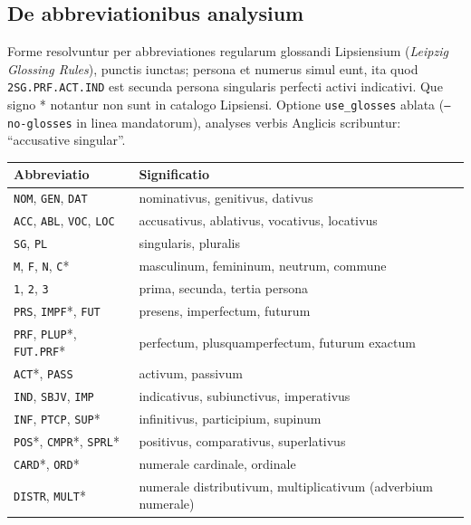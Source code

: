 \documentclass[12pt,
              article,
              oneside
              ]{memoir}
\begin{document}
\subsection{De abbreviationibus analysium}
\label{sec:glosses}

%
Forme resolvuntur per abbreviationes regularum glossandi Lipsiensium
(\textit{Leipzig Glossing Rules}), punctis iunctas; persona et numerus
simul eunt, ita quod \texttt{2SG.PRF.ACT.IND} est secunda persona
singularis perfecti activi indicativi. Que signo * notantur non sunt in
catalogo Lipsiensi. Optione \texttt{use\_glosses} ablata
(\texttt{--no-glosses} in linea mandatorum), analyses verbis Anglicis
scribuntur: \enquote{accusative singular}.

\begin{longtable}{@{}lp{}@{}}
\toprule
Abbreviatio & Significatio\\
\midrule
\endhead
\texttt{NOM}, \texttt{GEN}, \texttt{DAT} & nominativus, genitivus, dativus\\
\texttt{ACC}, \texttt{ABL}, \texttt{VOC}, \texttt{LOC} & accusativus, ablativus, vocativus, locativus\\
\texttt{SG}, \texttt{PL} & singularis, pluralis\\
\texttt{M}, \texttt{F}, \texttt{N}, \texttt{C}* & masculinum, femininum, neutrum, commune\\
\texttt{1}, \texttt{2}, \texttt{3} & prima, secunda, tertia persona\\
\texttt{PRS}, \texttt{IMPF}*, \texttt{FUT} & presens, imperfectum, futurum\\
\texttt{PRF}, \texttt{PLUP}*, \texttt{FUT.PRF}* & perfectum, plusquamperfectum, futurum exactum\\
\texttt{ACT}*, \texttt{PASS} & activum, passivum\\
\texttt{IND}, \texttt{SBJV}, \texttt{IMP} & indicativus, subiunctivus, imperativus\\
\texttt{INF}, \texttt{PTCP}, \texttt{SUP}* & infinitivus, participium, supinum\\
\texttt{POS}*, \texttt{CMPR}*, \texttt{SPRL}* & positivus, comparativus, superlativus\\
\texttt{CARD}*, \texttt{ORD}* & numerale cardinale, ordinale\\
\texttt{DISTR}, \texttt{MULT}* & numerale distributivum, multiplicativum (adverbium numerale)\\
\bottomrule
\end{longtable}
\end{document}
